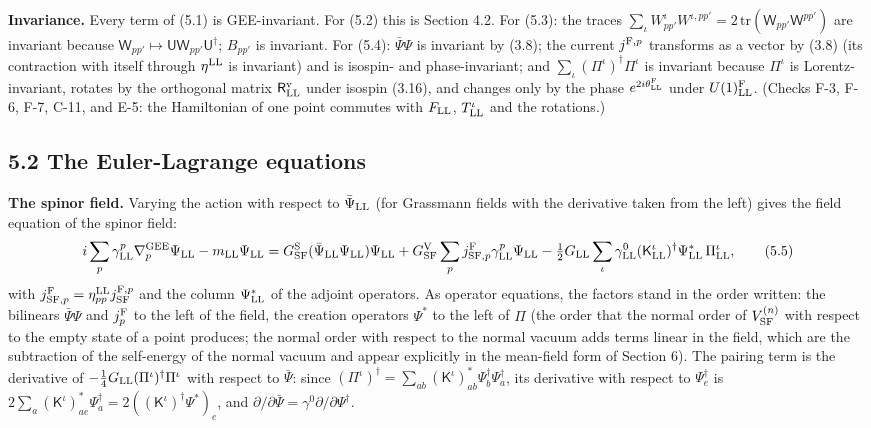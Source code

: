 \documentclass[
  10pt,
]{article}
\begin{document}
\textbf{Invariance.} Every term of (5.1) is GEE-invariant. For (5.2)
this is Section 4.2. For (5.3): the traces
\(\sum_\iota W^\iota_{pp'}W^{\iota,pp'}=2\,\mathrm{tr}(\mathsf W_{pp'}\mathsf W^{pp'})\)
are invariant because
\(\mathsf W_{pp'}\mapsto\mathsf U\mathsf W_{pp'}\mathsf U^\dagger\);
\(B_{pp'}\) is invariant. For (5.4): \(\bar\Psi\Psi\) is invariant by
(3.8); the current \(j^{{\rm F},p}\) transforms as a vector by (3.8)
(its contraction with itself through \(\eta^{\rm LL}\) is invariant) and
is isospin- and phase-invariant; and
\(\sum_\iota(\Pi^\iota)^\dagger\Pi^\iota\) is invariant because
\(\Pi^\iota\) is Lorentz-invariant, rotates by the orthogonal matrix
\(\mathsf R^{\rm v}_{\rm LL}\) under isospin (3.16), and changes only by
the phase \(e^{2i\theta^{\rm F}_{\rm LL}}\) under
\(U(1)^{\rm F}_{\rm LL}\). (Checks F-3, F-6, F-7, C-11, and E-5: the
Hamiltonian of one point commutes with \(F_{\rm LL}\),
\(T^\iota_{\rm LL}\) and the rotations.)

\hypertarget{the-euler-lagrange-equations}{%
\subsection{5.2 The Euler-Lagrange
equations}\label{the-euler-lagrange-equations}}

\textbf{The spinor field.} Varying the action with respect to
\(\bar\Psi_{\rm LL}\) (for Grassmann fields with the derivative taken
from the left) gives the field equation of the spinor field:
\[i\sum_p\gamma^p_{\rm LL}\nabla^{\rm GEE}_p\Psi_{\rm LL}-m_{\rm LL}\Psi_{\rm LL}=G^{\rm S}_{\rm SF}(\bar\Psi_{\rm LL}\Psi_{\rm LL})\Psi_{\rm LL}+G^{\rm V}_{\rm SF}\sum_pj^{\rm F}_{{\rm SF},p}\gamma^p_{\rm LL}\Psi_{\rm LL}-\tfrac12G_{\rm LL}\sum_\iota\gamma^0_{\rm LL}(\mathsf K^\iota_{\rm LL})^\dagger\Psi^*_{\rm LL}\,\Pi^\iota_{\rm LL},\tag{5.5}\]
with \(j^{\rm F}_{{\rm SF},p}=\eta^{\rm LL}_{pp}j^{{\rm F},p}_{\rm SF}\)
and the column \(\Psi^*_{\rm LL}\) of the adjoint operators. As operator
equations, the factors stand in the order written: the bilinears
\(\bar\Psi\Psi\) and \(j^{\rm F}_p\) to the left of the field, the
creation operators \(\Psi^*\) to the left of \(\Pi\) (the order that the
normal order of \(V^{(n)}_{\rm SF}\) with respect to the empty state of
a point produces; the normal order with respect to the normal vacuum
adds terms linear in the field, which are the subtraction of the
self-energy of the normal vacuum and appear explicitly in the mean-field
form of Section 6). The pairing term is the derivative of
\(-\tfrac14G_{\rm LL}(\Pi^\iota)^\dagger\Pi^\iota\) with respect to
\(\bar\Psi\): since
\((\Pi^\iota)^\dagger=\sum_{ab}(\mathsf K^\iota)^*_{ab}\Psi^\dagger_b\Psi^\dagger_a\),
its derivative with respect to \(\Psi^\dagger_e\) is
\(2\sum_a(\mathsf K^\iota)^*_{ae}\Psi^\dagger_a=2((\mathsf K^\iota)^\dagger\Psi^*)_e\),
and \(\partial/\partial\bar\Psi=\gamma^0\partial/\partial\Psi^\dagger\).
\end{document}
